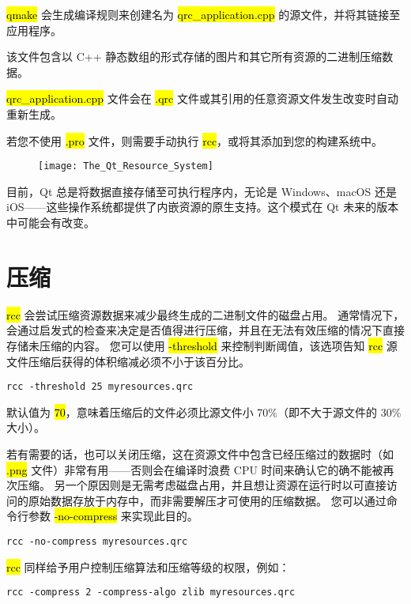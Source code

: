 \hl{qmake} 会生成编译规则来创建名为 \hl{qrc\_application.cpp} 的源文件，并将其链接至应用程序。

该文件包含以 C++ 静态数组的形式存储的图片和其它所有资源的二进制压缩数据。

\hl{qrc\_application.cpp} 文件会在 \hl{.qrc} 文件或其引用的任意资源文件发生改变时自动重新生成。

若您不使用 \hl{.pro} 文件，则需要手动执行 \hl{rcc}，或将其添加到您的构建系统中。

\begin{figure}[hbt!]  
	\centering
    \texttt{[image: The\_Qt\_Resource\_System]}
\end{figure}

目前，Qt 总是将数据直接存储至可执行程序内，无论是 Windows、macOS 还是 iOS——这些操作系统都提供了内嵌资源的原生支持。这个模式在 Qt 未来的版本中可能会有改变。

\section{压缩}

\hl{rcc} 会尝试压缩资源数据来减少最终生成的二进制文件的磁盘占用。
通常情况下，会通过启发式的检查来决定是否值得进行压缩，并且在无法有效压缩的情况下直接存储未压缩的内容。
您可以使用 \hl{-threshold} 来控制判断阈值，该选项告知 \hl{rcc} 源文件压缩后获得的体积缩减必须不小于该百分比。

\begin{lstlisting}   
rcc -threshold 25 myresources.qrc
\end{lstlisting}

默认值为 \hl{70}，意味着压缩后的文件必须比源文件小 70\%（即不大于源文件的 30\% 大小）。

若有需要的话，也可以关闭压缩，这在资源文件中包含已经压缩过的数据时（如 \hl{.png} 文件）非常有用——否则会在编译时浪费 CPU 时间来确认它的确不能被再次压缩。
另一个原因则是无需考虑磁盘占用，并且想让资源在运行时以可直接访问的原始数据存放于内存中，而非需要解压才可使用的压缩数据。
您可以通过命令行参数 \hl{-no-compress} 来实现此目的。

\begin{lstlisting}   
rcc -no-compress myresources.qrc
\end{lstlisting}

\hl{rcc} 同样给予用户控制压缩算法和压缩等级的权限，例如：

\begin{lstlisting}   
rcc -compress 2 -compress-algo zlib myresources.qrc
\end{lstlisting}

